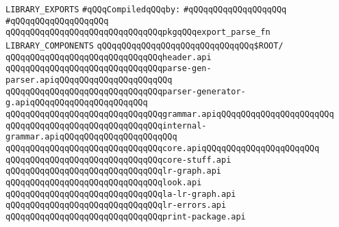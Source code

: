 \label{src/app/yacc/src/mythryl-yacc.lib}
\verb|LIBRARY_EXPORTS|\newline
\newline
\verb|#qQQqCompiledqQQqby:|\newline
\verb|#qQQqqQQqqQQqqQQqqQQq|\newline
\verb|#qQQqqQQqqQQqqQQqqQQq|\newline
\newline
\verb|qQQqqQQqqQQqqQQqqQQqqQQqqQQqqQQqpkgqQQqexport_parse_fn|\newline
\newline
\newline
\newline
\verb|LIBRARY_COMPONENTS|\newline
\newline
\verb|qQQqqQQqqQQqqQQqqQQqqQQqqQQqqQQq$ROOT/|\newline
\newline
\verb|qQQqqQQqqQQqqQQqqQQqqQQqqQQqqQQqheader.api|\newline
\verb|qQQqqQQqqQQqqQQqqQQqqQQqqQQqqQQqparse-gen-parser.apiqQQqqQQqqQQqqQQqqQQqqQQq|\newline
\verb|qQQqqQQqqQQqqQQqqQQqqQQqqQQqqQQqparser-generator-g.apiqQQqqQQqqQQqqQQqqQQqqQQq|\newline
\verb|qQQqqQQqqQQqqQQqqQQqqQQqqQQqqQQqgrammar.apiqQQqqQQqqQQqqQQqqQQqqQQq|\newline
\verb|qQQqqQQqqQQqqQQqqQQqqQQqqQQqqQQqinternal-grammar.apiqQQqqQQqqQQqqQQqqQQqqQQq|\newline
\verb|qQQqqQQqqQQqqQQqqQQqqQQqqQQqqQQqcore.apiqQQqqQQqqQQqqQQqqQQqqQQq|\newline
\verb|qQQqqQQqqQQqqQQqqQQqqQQqqQQqqQQqcore-stuff.api|\newline
\verb|qQQqqQQqqQQqqQQqqQQqqQQqqQQqqQQqlr-graph.api|\newline
\verb|qQQqqQQqqQQqqQQqqQQqqQQqqQQqqQQqlook.api|\newline
\verb|qQQqqQQqqQQqqQQqqQQqqQQqqQQqqQQqla-lr-graph.api|\newline
\verb|qQQqqQQqqQQqqQQqqQQqqQQqqQQqqQQqlr-errors.api|\newline
\verb|qQQqqQQqqQQqqQQqqQQqqQQqqQQqqQQqprint-package.api|\newline
